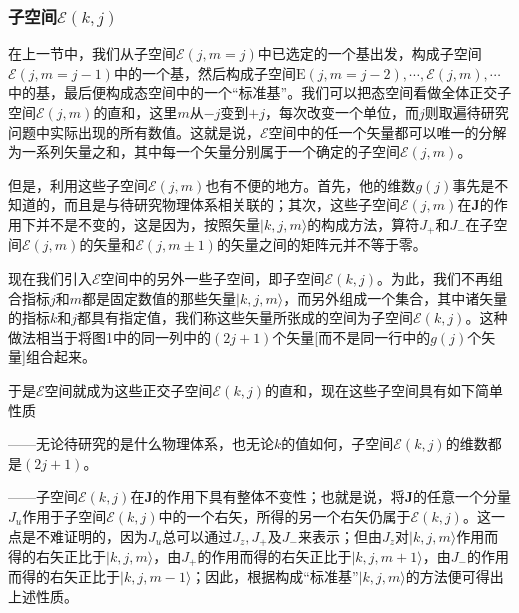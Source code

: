 \documentclass[]{article}
\begin{document}
\subsubsection{子空间$\mathscr{E}(k,j)$}
在上一节中，我们从子空间$\mathscr{E}(j,m=j)$中已选定的一个基出发，构成子空间$\mathscr{E}(j,m=j-1)$中的一个基，然后构成子空间$\mathrm{E}(j,m=j-2),\cdots,\mathscr{E}(j,m),\cdots$中的基，最后便构成态空间中的一个“标准基”。我们可以把态空间看做全体正交子空间$\mathscr{E}(j,m)$的直和，这里$m$从$-j$变到$+j$，每次改变一个单位，而$j$则取遍待研究问题中实际出现的所有数值。这就是说，$\mathscr{E}$空间中的任一个矢量都可以唯一的分解为一系列矢量之和，其中每一个矢量分别属于一个确定的子空间$\mathscr{E}(j,m)$。\par 
但是，利用这些子空间$\mathscr{E}(j,m)$也有不便的地方。首先，他的维数$g(j)$事先是不知道的，而且是与待研究物理体系相关联的；其次，这些子空间$\mathscr{E}(j,m)$在$\boldsymbol{J}$的作用下并不是不变的，这是因为，按照矢量$|k,j,m\rangle$的构成方法，算符$J_+$和$J_-$在子空间$\mathscr{E}(j,m)$的矢量和$\mathscr{E}(j,m\pm1)$的矢量之间的矩阵元并不等于零。\par 
现在我们引入$\mathscr{E}$空间中的另外一些子空间，即子空间$\mathscr{E}(k,j)$。为此，我们不再组合指标$j$和$m$都是固定数值的那些矢量$|k,j,m\rangle$，而另外组成一个集合，其中诸矢量的指标$k$和$j$都具有指定值，我们称这些矢量所张成的空间为子空间$\mathscr{E}(k,j)$。这种做法相当于将图1中的同一列中的$(2j+1)$个矢量[而不是同一行中的$g(j)$个矢量]组合起来。\par 
于是$\mathscr{E}$空间就成为这些正交子空间$\mathscr{E}(k,j)$的直和，现在这些子空间具有如下简单性质\par 
——无论待研究的是什么物理体系，也无论$k$的值如何，子空间$\mathscr{E}(k,j)$的维数都是$(2j+1)$。\par 
——子空间$\mathscr{E}(k,j)$在$\boldsymbol{J}$的作用下具有整体不变性；也就是说，将$\boldsymbol{J}$的任意一个分量$J_u$作用于子空间$\mathscr{E}(k,j)$中的一个右矢，所得的另一个右矢仍属于$\mathscr{E}(k,j)$。这一点是不难证明的，因为$J_u$总可以通过$J_z,J_+$及$J_-$来表示；但由$J_z$对$|k,j,m\rangle$作用而得的右矢正比于$|k,j,m\rangle$，由$J_+$的作用而得的右矢正比于$|k,j,m+1\rangle$，由$J_-$的作用而得的右矢正比于$|k,j,m-1\rangle$；因此，根据构成“标准基”${|k,j,m\rangle}$的方法便可得出上述性质。
\end{document}
